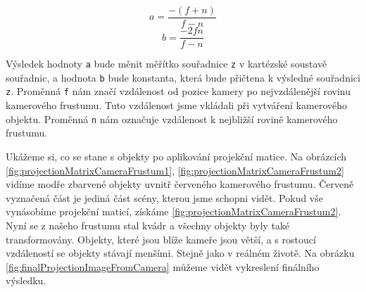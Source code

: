 \documentclass[czech,bachelor,dept420,male,cpdeclaration]{diploma}
\begin{document}
$$a = \frac{-\left(f+n\right)}{f-n}$$ 
$$b = \frac{-2fn}{f-n}$$ 

Výsledek hodnoty \texttt{a} bude měnit měřítko souřadnice \texttt{z} v kartézské soustavě souřadnic, a hodnota \texttt{b} bude konstanta, která bude přičtena k výsledné souřadnici \texttt{z}. Proměnná \texttt{f} nám značí vzdálenost od pozice kamery po nejvzdálenější rovinu kamerového frustumu. Tuto vzdálenost jsme vkládali při vytváření kamerového objektu. Proměnná \texttt{n} nám označuje vzdálenost k nejbližší rovině kamerového frustumu. 

Ukážeme si, co se stane s objekty po aplikování projekční matice. Na obrázcích \ref{fig:projectionMatrixCameraFrustum1}, \ref{fig:projectionMatrixCameraFrustum2} vidíme modře zbarvené objekty uvnitř červeného kamerového frustumu. Červeně vyznačená část je jediná část scény, kterou jsme schopni vidět. Pokud vše vynásobíme projekční maticí, získáme \ref{fig:projectionMatrixCameraFrustum2}. Nyní se z našeho frustumu stal kvádr a všechny objekty byly také transformovány. Objekty, které jsou blíže kameře jsou větší, a s rostoucí vzdáleností se objekty stávají menšími. Stejně jako v reálném životě. Na obrázku \ref{fig:finalProjectionImageFromCamera} můžeme vidět vykreslení finálního výsledku. 
\end{document}
